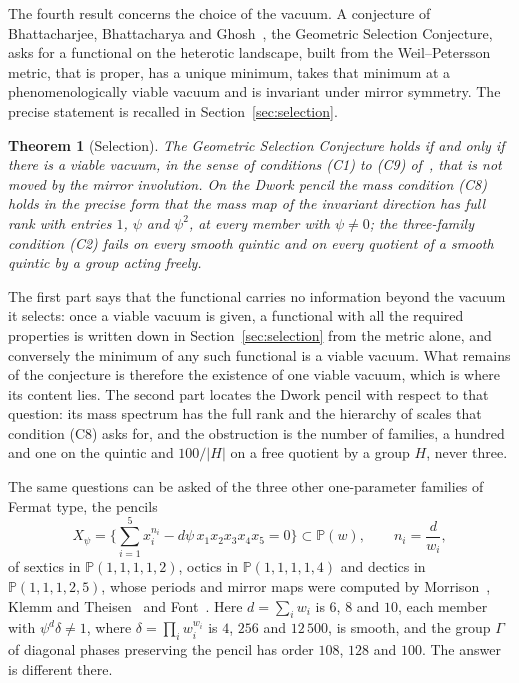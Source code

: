 \documentclass[11pt]{amsart}
\newtheorem{theorem}{Theorem}
\theoremstyle{definition}
\theoremstyle{remark}
\newcommand{\PP}{\mathbb{P}}
\begin{document}
The fourth result concerns the choice of the vacuum. A conjecture of
Bhattacharjee, Bhattacharya and Ghosh~\cite{Bha26a}, the Geometric Selection
Conjecture, asks for a functional on the heterotic landscape, built from the
Weil--Petersson metric, that is proper, has a unique minimum, takes that
minimum at a phenomenologically viable vacuum and is invariant under mirror
symmetry. The precise statement is recalled in Section~\ref{sec:selection}.

\begin{theorem}[Selection]\label{thm:D}
The Geometric Selection Conjecture holds if and only if there is a viable
vacuum, in the sense of conditions \textup{(C1)} to \textup{(C9)}
of~\cite{Bha26a}, that is not moved by the mirror involution. On the Dwork
pencil the mass condition \textup{(C8)} holds in the precise form that the
mass map of the invariant direction has full rank with entries $1$,
$\psi$ and $\psi^2$, at every member with $\psi\ne0$; the three-family
condition \textup{(C2)} fails on every smooth quintic and on every quotient
of a smooth quintic by a group acting freely.
\end{theorem}

The first part says that the functional carries no information beyond the
vacuum it selects: once a viable vacuum is given, a functional with all the
required properties is written down in Section~\ref{sec:selection} from the
metric alone, and conversely the minimum of any such functional is a viable
vacuum. What remains of the conjecture is therefore the existence of one
viable vacuum, which is where its content lies. The second part locates the
Dwork pencil with respect to that question: its mass spectrum has the full
rank and the hierarchy of scales that condition (C8) asks for, and the
obstruction is the number of families, a hundred and one on the quintic and
$100/|H|$ on a free quotient by a group $H$, never three.

The same questions can be asked of the three other one-parameter families
of Fermat type, the pencils
\begin{equation}\label{eq:wpencil}
X_\psi=\Big\{\sum_{i=1}^5x_i^{n_i}-d\psi\,x_1x_2x_3x_4x_5=0\Big\}
\subset\PP(w),\qquad n_i=\frac{d}{w_i},
\end{equation}
of sextics in $\PP(1,1,1,1,2)$, octics in $\PP(1,1,1,1,4)$ and dectics in
$\PP(1,1,1,2,5)$, whose periods and mirror maps were computed by
Morrison~\cite{Mor92}, Klemm and Theisen~\cite{KT93} and
Font~\cite{Fon93}. Here $d=\sum_iw_i$ is $6$, $8$ and $10$, each member
with $\psi^d\delta\ne1$, where $\delta=\prod_iw_i^{w_i}$ is $4$, $256$ and
$12\,500$, is smooth, and the group $\Gamma$ of diagonal phases preserving
the pencil has order $108$, $128$ and $100$. The answer is different there.
\end{document}
